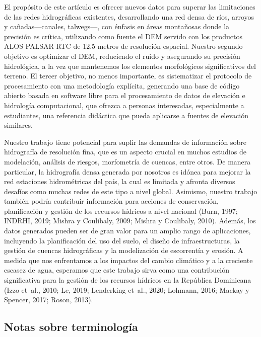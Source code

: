 \documentclass[spanish]{article}
\begin{document}
El propósito de este artículo es ofrecer nuevos datos para superar las
limitaciones de las redes hidrográficas existentes, desarrollando una
red densa de ríos, arroyos y cañadas---canales, talwegs---, con énfasis
en áreas montañosas donde la precisión es crítica, utilizando como
fuente el DEM servido con los productos ALOS PALSAR RTC de 12.5 metros
de resolución espacial. Nuestro segundo objetivo es optimizar el DEM,
reduciendo el ruido y asegurando su precisión hidrológica, a la vez que
mantenemos los elementos morfológicos significativos del terreno. El
tercer objetivo, no menos importante, es sistematizar el protocolo de
procesamiento con una metodología explícita, generando una base de
código abierto basada en software libre para el procesamiento de datos
de elevación e hidrología computacional, que ofrezca a personas
interesadas, especialmente a estudiantes, una referencia didáctica que
pueda aplicarse a fuentes de elevación similares.

Nuestro trabajo tiene potencial para suplir las demandas de información
sobre hidrografía de resolución fina, que es un aspecto crucial en
muchos estudios de modelación, análisis de riesgos, morfometría de
cuencas, entre otros. De manera particular, la hidrografía densa
generada por nosotros es idónea para mejorar la red estaciones
hidrométricas del país, la cual es limitada y afronta diversos desafíos
como muchas redes de este tipo a nivel global. Asimismo, nuestro trabajo
también podría contribuir información para acciones de conservación,
planificación y gestión de los recursos hídricos a nivel nacional (Burn,
1997; INDRHI, 2019; Mishra y Coulibaly, 2009; Mishra y Coulibaly, 2010).
Además, los datos generados pueden ser de gran valor para un amplio
rango de aplicaciones, incluyendo la planificación del uso del suelo, el
diseño de infraestructuras, la gestión de cuencas hidrográficas y la
modelización de escorrentía y erosión. A medida que nos enfrentamos a
los impactos del cambio climático y a la creciente escasez de agua,
esperamos que este trabajo sirva como una contribución significativa
para la gestión de los recursos hídricos en la República Dominicana
(Izzo et~al., 2010; Le, 2019; Lenderking et~al., 2020; Lohmann, 2016;
Mackay y Spencer, 2017; Roson, 2013).

\hypertarget{notas-sobre-terminologuxeda}{%
\subsection*{Notas sobre
terminología}\label{notas-sobre-terminologuxeda}}
\end{document}
